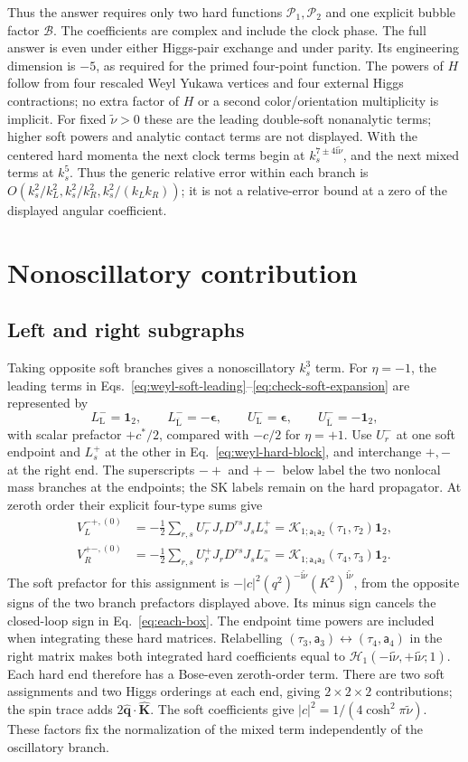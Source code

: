 \documentclass[a4paper,12pt]{article}
\newcommand{\ii}{\mathrm i}
\newcommand{\mb}{\mathbf}
\newcommand{\tn}{\tilde\nu}
\def\aa{\mathsf a}
\newcommand{\bq}{\mb q}
\newcommand{\one}{\mathbf1_2}
\newcommand{\epsmat}{\boldsymbol{\epsilon}}
\begin{document}
Thus the answer requires only two hard functions $\mathcal P_1,\mathcal P_2$
and one explicit bubble factor $\mathcal B$. The coefficients are complex and
include the clock phase. The full answer is even under either Higgs-pair exchange
and under parity. Its engineering dimension is $-5$, as required for the primed
four-point function. The powers of $H$ follow from four rescaled Weyl Yukawa
vertices and four external Higgs contractions; no extra factor of $H$ or a
second color/orientation multiplicity is implicit. For fixed $\tn>0$ these are the leading double-soft nonanalytic
terms; higher soft powers and analytic contact terms are not displayed.
With the centered hard momenta the next clock terms begin at
$k_s^{7\pm4\ii\tn}$, and the next mixed terms at $k_s^5$.
Thus the generic relative error within each branch is
$O(k_s^2/k_L^2,k_s^2/k_R^2,k_s^2/(k_Lk_R))$; it is not a
relative-error bound at a zero of the displayed angular coefficient.
\section{Nonoscillatory contribution}
\label{sec:mixed}
\subsection{Left and right subgraphs}
Taking opposite soft branches gives a nonoscillatory $k_s^3$ term.
For $\eta=-1$, the leading terms in
Eqs.~\eqref{eq:weyl-soft-leading}--\eqref{eq:check-soft-expansion}
are represented by
\[
 L_{\mathrm L}^-=\one,\qquad
 L_{\overline{\mathrm L}}^-=-\epsmat,\qquad
 U_{\mathrm L}^-=\epsmat,\qquad
 U_{\overline{\mathrm L}}^-=-\one,
\]
with scalar prefactor $+c^*/2$, compared with $-c/2$ for $\eta=+1$.
Use $U^-_r$ at one soft endpoint and $L^+_s$ at the other in
Eq.~\eqref{eq:weyl-hard-block}, and interchange $+,-$ at the right end.
The superscripts $-+$ and $+-$ below label the two nonlocal mass
branches at the endpoints; the SK labels remain on the hard propagator.
At zeroth order their explicit four-type sums give
\begin{align}
 V_L^{-+,(0)}&=-\frac12\sum_{r,s}U_r^-J_rD^{rs}J_sL_s^+
 =\mathcal K_{1;\aa_1\aa_2}(\tau_1,\tau_2)\one,\nonumber\\
 V_R^{+-,(0)}&=-\frac12\sum_{r,s}U_r^+J_rD^{rs}J_sL_s^-
 =\mathcal K_{1;\aa_4\aa_3}(\tau_4,\tau_3)\one.
 \label{eq:mixed-weyl-hard}
\end{align}
The soft prefactor for this assignment is
$-|c|^2(q^2)^{-\ii\tn}(K^2)^{\ii\tn}$, from the opposite signs
of the two branch prefactors displayed above.
Its minus sign cancels the closed-loop sign in Eq.~\eqref{eq:each-box}.
The endpoint time powers are included when integrating these hard
matrices. Relabelling $(\tau_3,\aa_3)\leftrightarrow(\tau_4,\aa_4)$
in the right matrix makes both integrated hard coefficients equal to
$\mathcal H_1(-\ii\tn,+\ii\tn;1)$.
Each hard end therefore has a Bose-even
zeroth-order term. There are two soft assignments and two Higgs orderings
at each end, giving $2\times2\times2$ contributions; the spin trace
adds $2\widehat{\bq}\cdot\widehat{\mb K}$. The soft coefficients give
$|c|^2=1/(4\cosh^2\pi\tn)$. These factors fix the normalization of
the mixed term independently of the oscillatory branch.
\end{document}
